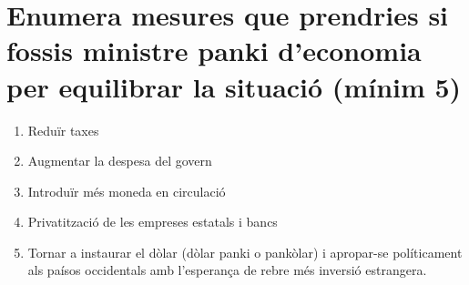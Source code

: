 \section{Enumera mesures que prendries si fossis ministre panki d’economia per
equilibrar la situació (mínim 5)}

\begin{enumerate}
  \item Reduïr taxes
  \item Augmentar la despesa del govern
  \item Introduïr més moneda en circulació
  \item Privatització de les empreses estatals i bancs
  \item Tornar a instaurar el dòlar (dòlar panki o pankòlar) 
  i apropar-se políticament als paísos
  occidentals amb l'esperança de rebre més inversió estrangera.
\end{enumerate}
